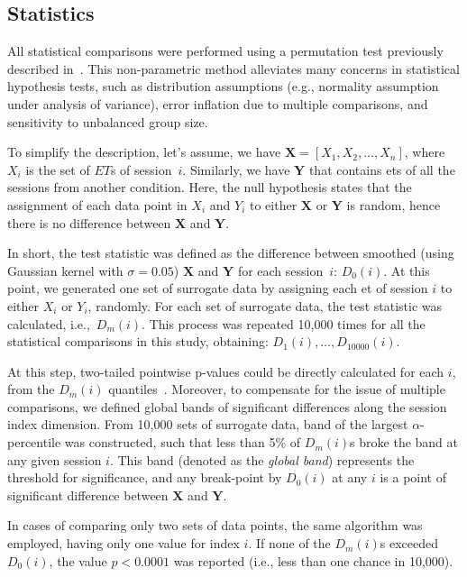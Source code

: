 \subsection{Statistics}
All statistical comparisons were performed using a permutation test previously described in~\cite{Fujisawa2008NN}.
This non-parametric method alleviates many concerns in statistical hypothesis tests, such as distribution assumptions (e.g., normality assumption under analysis of variance), error inflation due to multiple comparisons, and sensitivity to unbalanced group size.
\par
To simplify the description, let's assume, we have ${\mathbf{X}=[X_1, X_2,...,X_n]}$, where $X_i$ is the set of $ET$s of session~$i$.
Similarly, we have $\mathbf{Y}$ that contains \glspl{et} of all the sessions from another condition.
Here, the null hypothesis states that the assignment of each data point in $X_i$ and $Y_i$ to either $\mathbf{X}$ or $\mathbf{Y}$ is random, hence there is no difference between $\mathbf{X}$ and $\mathbf{Y}$.
\par
In short, the test statistic was defined as the difference between smoothed (using Gaussian kernel with $\sigma =0.05$) $\mathbf{X}$ and $\mathbf{Y}$ for each session~$i$: $D_0(i)$.
At this point, we generated one set of surrogate data by assigning each \gls{et} of session $i$ to either $X_i$ or $Y_i$, randomly.
For each set of surrogate data, the test statistic was calculated, i.e.,~$D_m(i)$.
This process was repeated 10,000 times for all the statistical comparisons in this study, obtaining: $D_1(i),\ldots,D_{10000}(i)$.
\par
At this step, two-tailed pointwise p-values could be directly calculated for each $i$, from the $D_m(i)$ quantiles~\cite[see][]{Fujisawa2008NN}.
Moreover, to compensate for the issue of multiple comparisons, we defined global bands of significant differences along the session index dimension.
From 10,000 sets of surrogate data, band of the largest $\alpha$-percentile was constructed, such that less than 5\% of $D_m(i)$s broke the band at any given session $i$.
This band (denoted as the \textit{global band}) represents the threshold for significance, and any break-point by $D_0(i)$ at any $i$ is a point of significant difference between $\mathbf{X}$ and $\mathbf{Y}$.
\par
In cases of comparing only two sets of data points, the same algorithm was employed, having only one value for index $i$.
If none of the $D_m(i)$s exceeded $D_0(i)$, the value $p<0.0001$ was reported (i.e., less than one chance in 10,000).
